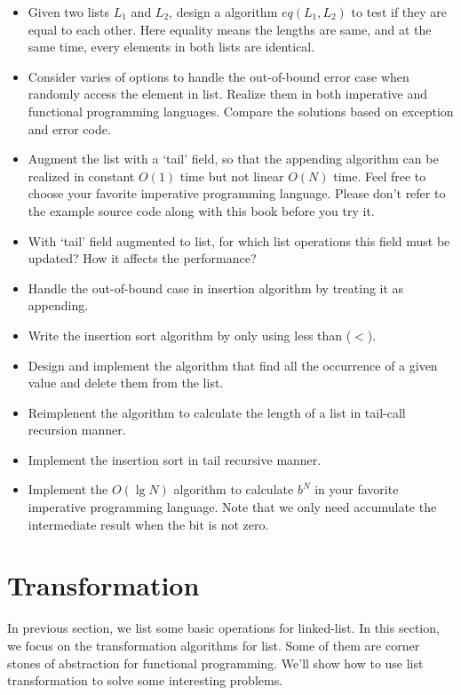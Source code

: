 \documentclass{article}
\begin{document}
\begin{Exercise}
\begin{itemize}
\item Given two lists $L_1$ and $L_2$, design a algorithm $eq(L_1, L_2)$ to test if they are equal to each other.
Here equality means the lengths are same, and at the same time, every elements in both lists are identical.
\item Consider varies of options to handle the out-of-bound error case when randomly access the element in list. Realize
them in both imperative and functional programming languages. Compare the solutions based on exception and error code.
\item Augment the list with a `tail' field, so that the appending algorithm can be realized in constant $O(1)$ time but
not linear $O(N)$ time. Feel free to choose your favorite imperative programming language. Please don't refer to the
example source code along with this book before you try it.
\item With `tail' field augmented to list, for which list operations this field must be updated? How it affects the
performance?
\item Handle the out-of-bound case in insertion algorithm by treating it as appending.
\item Write the insertion sort algorithm by only using less than ($<$).
\item Design and implement the algorithm that find all the occurrence of a given value and delete them from the list.
\item Reimplenent the algorithm to calculate the length of a list in tail-call recursion manner.
\item Implement the insertion sort in tail recursive manner.
\item Implement the $O(\lg N)$ algorithm to calculate $b^N$ in your favorite imperative programming language. Note that
we only need accumulate the intermediate result when the bit is not zero.
\end{itemize}
\end{Exercise}

\section{Transformation}
In previous section, we list some basic operations for linked-list. In this section, we focus on the transformation
algorithms for list. Some of them are corner stones of abstraction for functional programming. We'll show how to use
list transformation to solve some interesting problems.
\end{document}
